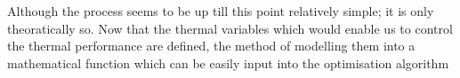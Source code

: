 \documentclass[11pt,a4paper,oneside]{article}
\begin{document}
\begin{multicols}{2}
Although the process seems to be up till this point relatively simple; it is only theoratically so. Now that the thermal variables which would enable us to control the thermal performance are defined, the method of modelling them into a mathematical function which can be easily input into the optimisation algorithm


\end{multicols}



\end{document}

